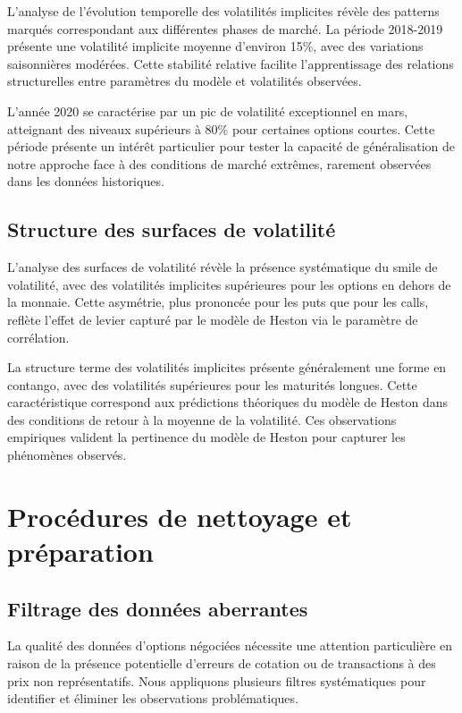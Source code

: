 L'analyse de l'évolution temporelle des volatilités implicites révèle des patterns marqués correspondant aux différentes phases de marché. La période 2018-2019 présente une volatilité implicite moyenne d'environ 15\%, avec des variations saisonnières modérées. Cette stabilité relative facilite l'apprentissage des relations structurelles entre paramètres du modèle et volatilités observées.

L'année 2020 se caractérise par un pic de volatilité exceptionnel en mars, atteignant des niveaux supérieurs à 80\% pour certaines options courtes. Cette période présente un intérêt particulier pour tester la capacité de généralisation de notre approche face à des conditions de marché extrêmes, rarement observées dans les données historiques.

\subsection{Structure des surfaces de volatilité}

L'analyse des surfaces de volatilité révèle la présence systématique du smile de volatilité, avec des volatilités implicites supérieures pour les options en dehors de la monnaie. Cette asymétrie, plus prononcée pour les puts que pour les calls, reflète l'effet de levier capturé par le modèle de Heston via le paramètre de corrélation.

La structure terme des volatilités implicites présente généralement une forme en contango, avec des volatilités supérieures pour les maturités longues. Cette caractéristique correspond aux prédictions théoriques du modèle de Heston dans des conditions de retour à la moyenne de la volatilité. Ces observations empiriques valident la pertinence du modèle de Heston pour capturer les phénomènes observés.

\section{Procédures de nettoyage et préparation}

\subsection{Filtrage des données aberrantes}

La qualité des données d'options négociées nécessite une attention particulière en raison de la présence potentielle d'erreurs de cotation ou de transactions à des prix non représentatifs. Nous appliquons plusieurs filtres systématiques pour identifier et éliminer les observations problématiques.

